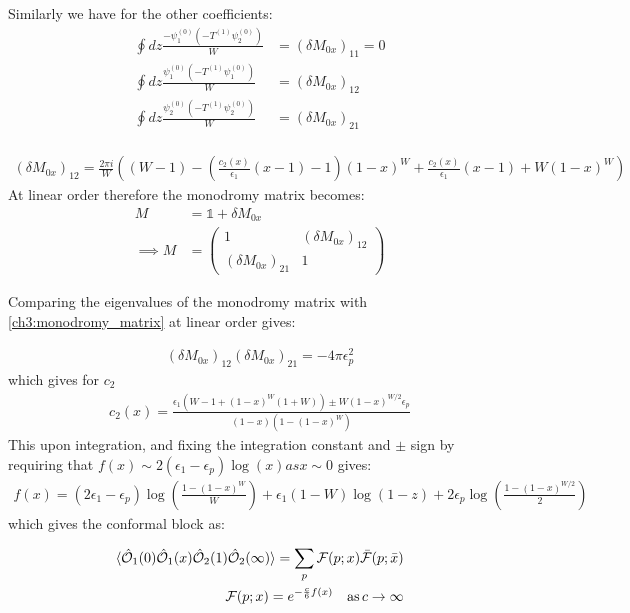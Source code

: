   Similarly we have for the other coefficients:
  \begin{align}
   \oint dz \frac{-\psi_1^{(0)}(-T^{(1)}\psi^{(0)}_2)}{W} &= (\delta M_{0x})_{11} =0 \\
   \oint dz \frac{\psi_1^{(0)}(-T^{(1)}\psi^{(0)}_1)}{W} &= (\delta M_{0x})_{12} \\
   \oint dz \frac{\psi_2^{(0)}(-T^{(1)}\psi^{(0)}_2)}{W} &= (\delta M_{0x})_{21} \\ 
  \end{align}
  
  \begin{align}
   (\delta M_{0x})_{12}= \frac{2\pi i}{W}\left( (W-1)-\left(\frac{c_2(x)}{\epsilon_1}(x-1)-1 \right)(1-x)^W+\frac{c_2(x)}{\epsilon_1}(x-1) + W(1-x)^W\right)
  \end{align}
  At linear order therefore the monodromy matrix becomes:
  \begin{align}
   M &= \mathbb{1}+\delta M_{0x} \\
   \implies M &= \left( \begin{array}{cc}
                 1 & (\delta M_{0x})_{12}\\
                 (\delta M_{0x})_{21} & 1
                \end{array} \right)
  \end{align}

  Comparing the eigenvalues of the monodromy matrix with \ref{ch3:monodromy_matrix} at linear order gives:
  
  \begin{align}
    (\delta M_{0x})_{12}  (\delta M_{0x})_{21} = -4\pi \epsilon_p^2
  \end{align}
  which gives for $c_2$
  \begin{align}
   c_2(x)=\frac{\epsilon_1(W-1+(1-x)^W(1+W))\pm W(1-x)^{W/2}\epsilon_p}{(1-x)(1-(1-x)^W)}
  \end{align}
  This upon integration, and fixing the integration constant and $\pm$ sign by requiring that $f(x) \sim 2(\epsilon_1- \epsilon_p)\log(x) as x \sim 0$ gives:
  \begin{align}
   f(x) = (2\epsilon_1- \epsilon_p)\log(\frac{1-(1-x)^W}{W}) + \epsilon_1(1-W)\log(1-z)+2\epsilon_p \log(\frac{1-(1-x)^{W/2}}{2})
  \end{align}
  which gives the conformal block as:
  
  \begin{align}
   \braket{\hat{\mathcal{{O}}}_1(0)\hat{\mathcal{{O}}}_1(x)\hat{\mathcal{{O}}}_2(1)\hat{\mathcal{{O}}}_2(\infty)} = \sum_p \mathcal{F}(p;x) \bar{\mathcal{F}}(p;\bar x) \\   
   \mathcal{F}(p;x) =e^{-\frac{c}{6}f(x)} \quad \text{as} \, c \to \infty
  \end{align}

  
  
  
